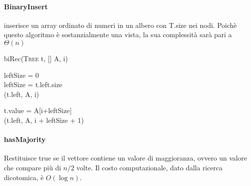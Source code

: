 \documentclass[../../notes.tex]{subfiles}
\begin{document}
  \paragraph{BinaryInsert} inserisce un array ordinato di numeri in un albero con T.size nei nodi. Poichè questo algoritmo è sostanzialmente una vista, la sua complessità sarà pari a $\Theta(n)$

  \begin{algorithm}
    \NoCaptionOfAlgo
    \caption{biRec(\textsc{Tree} t, [] A,  i)}
     leftSize = 0\\
     {
      leftSize = t.left.size\\
      (t.left, A, i)\\
    }

    t.value = A[i+leftSize]\\
     {
      (t.left, A, i + leftSize + 1)\\
    }
  \end{algorithm}

  \paragraph{hasMajority} Restituisce true se il vettore contiene un valore di maggioranza, ovvero un valore che compare più di $n/2$ volte. Il costo computazionale, dato dalla ricerca dicotomica, è $O(\log n)$.
\end{document}
